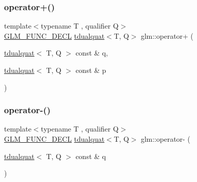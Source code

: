 \mbox{\label{group__gtx__dual__quaternion_ga55e10eaaabe1166be6314df62591c134}} 
\subsubsection{\texorpdfstring{operator+()}{operator+()}\hspace{0.1cm}{\footnotesize\ttfamily [2/2]}}
{\footnotesize\ttfamily template$<$typename T , qualifier Q$>$ \\
\hyperlink{setup_8hpp_ab2d052de21a70539923e9bcbf6e83a51}{G\+L\+M\+\_\+\+F\+U\+N\+C\+\_\+\+D\+E\+CL} \hyperlink{structglm_1_1tdualquat}{tdualquat}$<$T, Q$>$ glm\+::operator+ (\begin{DoxyParamCaption}\item[{\hyperlink{structglm_1_1tdualquat}{tdualquat}$<$ T, Q $>$ const \&}]{q,  }\item[{\hyperlink{structglm_1_1tdualquat}{tdualquat}$<$ T, Q $>$ const \&}]{p }\end{DoxyParamCaption})}

\mbox{\label{group__gtx__dual__quaternion_ga2245f8ea1b7c8a3fccfc92ca97ef03de}} 
\subsubsection{\texorpdfstring{operator-\/()}{operator-()}}
{\footnotesize\ttfamily template$<$typename T , qualifier Q$>$ \\
\hyperlink{setup_8hpp_ab2d052de21a70539923e9bcbf6e83a51}{G\+L\+M\+\_\+\+F\+U\+N\+C\+\_\+\+D\+E\+CL} \hyperlink{structglm_1_1tdualquat}{tdualquat}$<$T, Q$>$ glm\+::operator-\/ (\begin{DoxyParamCaption}\item[{\hyperlink{structglm_1_1tdualquat}{tdualquat}$<$ T, Q $>$ const \&}]{q }\end{DoxyParamCaption})}

